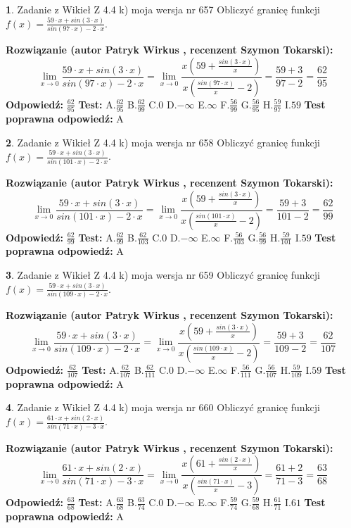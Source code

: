 \documentclass[12pt, a4paper]{article}
\theoremstyle{definition} %
\newtheorem{zad}{}
\newcommand{\zadStart}[1]{\begin{zad}#1\newline}
\newcommand{\zadStop}{\end{zad}}
\newcommand{\rozwStart}[2]{\noindent \textbf{Rozwiązanie (autor #1 , recenzent #2): }\newline}
\newcommand{\rozwStop}{\newline}
\newcommand{\odpStart}{\noindent \textbf{Odpowiedź:}\newline}
\newcommand{\odpStop}{\newline}
\newcommand{\testStart}{\noindent \textbf{Test:}\newline}
\newcommand{\testStop}{\newline}
\newcommand{\kluczStart}{\noindent \textbf{Test poprawna odpowiedź:}\newline}
\newcommand{\kluczStop}{\newline}
\begin{document}
\zadStart{Zadanie z Wikieł Z 4.4 k) moja wersja nr 657}
Obliczyć granicę funkcji $f(x)=\frac{59\cdot x +sin(3\cdot x)}{sin(97\cdot x) -2\cdot x}$.
\zadStop
\rozwStart{Patryk Wirkus}{Szymon Tokarski}
$$\lim\limits_{x\to 0}\frac{59\cdot x +sin(3\cdot x)}{sin(97\cdot x) -2\cdot x}
=\lim\limits_{x\to 0}\frac{x(59+\frac{sin(3\cdot x)}{x})}{x(\frac{sin(97\cdot x)}{x}-2)}
=\frac{59+3}{97-2} = \frac{62}{95}$$
\rozwStop
\odpStart
$\frac{62}{95}$
\odpStop
\testStart
A.$\frac{62}{95}$
B.$\frac{62}{99}$
C.$0$
D.$-\infty$
E.$\infty$
F.$\frac{56}{99}$
G.$\frac{56}{95}$
H.$\frac{59}{97}$
I.$59$
\testStop
\kluczStart
A
\kluczStop



\zadStart{Zadanie z Wikieł Z 4.4 k) moja wersja nr 658}
Obliczyć granicę funkcji $f(x)=\frac{59\cdot x +sin(3\cdot x)}{sin(101\cdot x) -2\cdot x}$.
\zadStop
\rozwStart{Patryk Wirkus}{Szymon Tokarski}
$$\lim\limits_{x\to 0}\frac{59\cdot x +sin(3\cdot x)}{sin(101\cdot x) -2\cdot x}
=\lim\limits_{x\to 0}\frac{x(59+\frac{sin(3\cdot x)}{x})}{x(\frac{sin(101\cdot x)}{x}-2)}
=\frac{59+3}{101-2} = \frac{62}{99}$$
\rozwStop
\odpStart
$\frac{62}{99}$
\odpStop
\testStart
A.$\frac{62}{99}$
B.$\frac{62}{103}$
C.$0$
D.$-\infty$
E.$\infty$
F.$\frac{56}{103}$
G.$\frac{56}{99}$
H.$\frac{59}{101}$
I.$59$
\testStop
\kluczStart
A
\kluczStop



\zadStart{Zadanie z Wikieł Z 4.4 k) moja wersja nr 659}
Obliczyć granicę funkcji $f(x)=\frac{59\cdot x +sin(3\cdot x)}{sin(109\cdot x) -2\cdot x}$.
\zadStop
\rozwStart{Patryk Wirkus}{Szymon Tokarski}
$$\lim\limits_{x\to 0}\frac{59\cdot x +sin(3\cdot x)}{sin(109\cdot x) -2\cdot x}
=\lim\limits_{x\to 0}\frac{x(59+\frac{sin(3\cdot x)}{x})}{x(\frac{sin(109\cdot x)}{x}-2)}
=\frac{59+3}{109-2} = \frac{62}{107}$$
\rozwStop
\odpStart
$\frac{62}{107}$
\odpStop
\testStart
A.$\frac{62}{107}$
B.$\frac{62}{111}$
C.$0$
D.$-\infty$
E.$\infty$
F.$\frac{56}{111}$
G.$\frac{56}{107}$
H.$\frac{59}{109}$
I.$59$
\testStop
\kluczStart
A
\kluczStop



\zadStart{Zadanie z Wikieł Z 4.4 k) moja wersja nr 660}
Obliczyć granicę funkcji $f(x)=\frac{61\cdot x +sin(2\cdot x)}{sin(71\cdot x) -3\cdot x}$.
\zadStop
\rozwStart{Patryk Wirkus}{Szymon Tokarski}
$$\lim\limits_{x\to 0}\frac{61\cdot x +sin(2\cdot x)}{sin(71\cdot x) -3\cdot x}
=\lim\limits_{x\to 0}\frac{x(61+\frac{sin(2\cdot x)}{x})}{x(\frac{sin(71\cdot x)}{x}-3)}
=\frac{61+2}{71-3} = \frac{63}{68}$$
\rozwStop
\odpStart
$\frac{63}{68}$
\odpStop
\testStart
A.$\frac{63}{68}$
B.$\frac{63}{74}$
C.$0$
D.$-\infty$
E.$\infty$
F.$\frac{59}{74}$
G.$\frac{59}{68}$
H.$\frac{61}{71}$
I.$61$
\testStop
\kluczStart
A
\kluczStop
\end{document}
